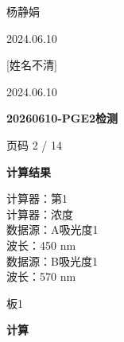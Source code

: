 \documentclass[UTF8,10pt,a4paper,fontset=fandol]{ctexart}
\newcommand{\handwritten}[1]{#1}
\begin{document}
\handwritten{杨静娟}

\handwritten{2024.06.10}

\handwritten{[姓名不清]}

\handwritten{2024.06.10}

\newpage

\begin{flushleft}
\textbf{20260610-PGE2检测}
\end{flushleft}

\begin{flushright}
页码 2 / 14
\end{flushright}

\noindent
\textbf{计算结果}

\noindent
计算器：第1\\
计算器：浓度\\
数据源：A吸光度1\\
波长：450 nm\\
数据源：B吸光度1\\
波长：570 nm

\medskip

\noindent
板1

\noindent
\textbf{计算}

\medskip
\end{document}
